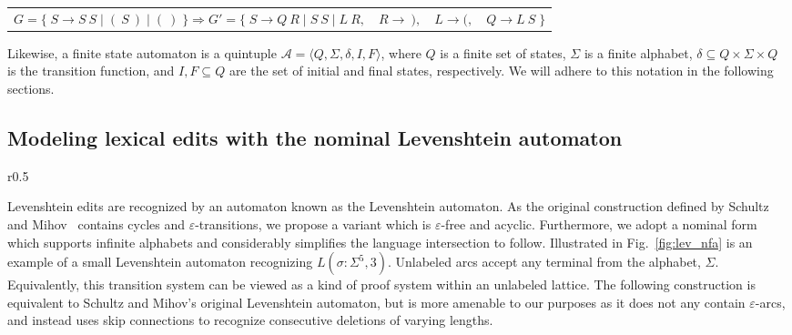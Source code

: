 \documentclass[sigplan,review,acmsmall,nonacm,anonymous]{acmart}\settopmatter{printfolios=false,printccs=false,printacmref=false}
\begin{document}
  \begin{table}[H]
    \begin{tabular}{llll}
      $G = \big\{\;S \rightarrow S\:S \mid (\:S\:) \mid (\:)\;\big\} \Longrightarrow G' = \big\{\;S\rightarrow Q\:R \mid S\:S \mid L\:R,$ & $R \rightarrow\:),$ & $L \rightarrow (,$ & $Q\rightarrow L\:S\;\big\}$
    \end{tabular}
  \end{table}\vspace{-8pt}

  Likewise, a finite state automaton is a quintuple $\mathcal{A} = \langle Q, \Sigma, \delta, I, F\rangle$, where $Q$ is a finite set of states, $\Sigma$ is a finite alphabet, $\delta \subseteq Q \times \Sigma \times Q$ is the transition function, and $I, F \subseteq Q$ are the set of initial and final states, respectively. We will adhere to this notation in the following sections.

  \clearpage\subsection{Modeling lexical edits with the nominal Levenshtein automaton}\label{sec:lev_nfa}

  \begin{wrapfigure}{r}{0.5\textwidth}
    \vspace{-0.3cm}
    \begin{center}
      
    \end{center}
    \caption{NFA recognizing Levenshtein $L(\sigma: \Sigma^5, 3)$.}\label{fig:lev_nfa}
    \vspace{-0.5cm}
  \end{wrapfigure}

  Levenshtein edits are recognized by an automaton known as the Levenshtein automaton. As the original construction defined by Schultz and Mihov~\cite{schulz2002fast} contains cycles and $\varepsilon$-transitions, we propose a variant which is $\varepsilon$-free and acyclic. Furthermore, we adopt a nominal form which supports infinite alphabets and considerably simplifies the language intersection to follow. Illustrated in Fig.~\ref{fig:lev_nfa} is an example of a small Levenshtein automaton recognizing $L(\sigma: \Sigma^5, 3)$. Unlabeled arcs accept any terminal from the alphabet, $\Sigma$. Equivalently, this transition system can be viewed as a kind of proof system within an unlabeled lattice. The following construction is equivalent to Schultz and Mihov's original Levenshtein automaton, but is more amenable to our purposes as it does not any contain $\varepsilon$-arcs, and instead uses skip connections to recognize consecutive deletions of varying lengths.
\end{document}
